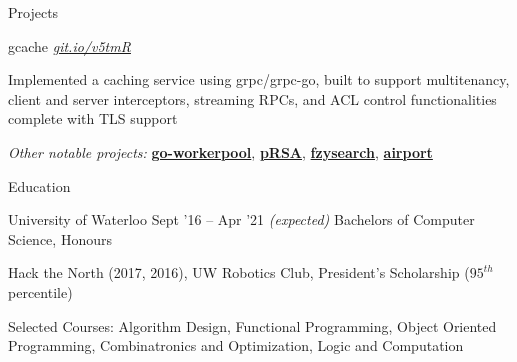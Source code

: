 \documentclass{resume} %
\begin{document}
\begin{rSection}{Projects}
  \begin{rSubsection}{gcache}
	  {\em {\href{http://github.com/ridwanmsharif/cache}
		    {git.io/v5tmR}}}
	  {}

    \item Implemented a caching service using grpc/grpc-go, built to support multitenancy,
      client and server interceptors, streaming RPCs, and ACL control functionalities complete with TLS support
  \end{rSubsection}
  
  \begin{rMinisection}
    \item {\em Other notable projects:}
      \href{https://github.com/ridwanmsharif/goworkerpool}{\textbf{go-workerpool}},
      \href{https://github.com/ridwanmsharif/prsa}{\textbf{pRSA}},
      \href{https://github.com/ridwanmsharif/fzysearch}{\textbf{fzysearch}},
      \href{https://github.com/ridwanmsharif/airport}{\textbf{airport}}
  \end{rMinisection}
\end{rSection}


\begin{rSection}{Education}
  \begin{rSubsection}{University of Waterloo}
		     {Sept '16 -- Apr '21 \em (expected)}
		     {Bachelors of Computer Science, Honours}
		     {}
    \item Hack the North (2017, 2016), UW Robotics Club, President's Scholarship
      ($95^{th}$ percentile)
    \item Selected Courses: Algorithm Design, Functional Programming, Object
      Oriented Programming, Combinatronics and Optimization, Logic and
      Computation
  \end{rSubsection}
\end{rSection} 
\end{document}
